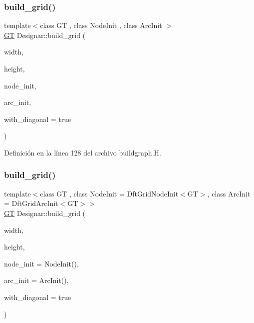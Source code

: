 \mbox{\label{namespace_designar_aec5eb60a497214494947086c4cd7af76}} 
\subsubsection{\texorpdfstring{build\+\_\+grid()}{build\_grid()}\hspace{0.1cm}{\footnotesize\ttfamily [1/2]}}
{\footnotesize\ttfamily template$<$class GT , class Node\+Init , class Arc\+Init $>$ \\
\hyperlink{demo-buildgraph_8_c_a3001c40d2c31ca87ed96cd7d1334a55e}{GT} Designar\+::build\+\_\+grid (\begin{DoxyParamCaption}\item[{\hyperlink{namespace_designar_aa72662848b9f4815e7bf31a7cf3e33d1}{nat\+\_\+t}}]{width,  }\item[{\hyperlink{namespace_designar_aa72662848b9f4815e7bf31a7cf3e33d1}{nat\+\_\+t}}]{height,  }\item[{Node\+Init \&}]{node\+\_\+init,  }\item[{Arc\+Init \&}]{arc\+\_\+init,  }\item[{bool}]{with\+\_\+diagonal = {\ttfamily true} }\end{DoxyParamCaption})}



Definición en la línea 128 del archivo buildgraph.\+H.

\mbox{\label{namespace_designar_a57d0b4318f5ae1ef0082a67d7eeb10fe}} 
\subsubsection{\texorpdfstring{build\+\_\+grid()}{build\_grid()}\hspace{0.1cm}{\footnotesize\ttfamily [2/2]}}
{\footnotesize\ttfamily template$<$class GT , class Node\+Init  = Dft\+Grid\+Node\+Init$<$\+G\+T$>$, class Arc\+Init  = Dft\+Grid\+Arc\+Init$<$\+G\+T$>$$>$ \\
\hyperlink{demo-buildgraph_8_c_a3001c40d2c31ca87ed96cd7d1334a55e}{GT} Designar\+::build\+\_\+grid (\begin{DoxyParamCaption}\item[{\hyperlink{namespace_designar_aa72662848b9f4815e7bf31a7cf3e33d1}{nat\+\_\+t}}]{width,  }\item[{\hyperlink{namespace_designar_aa72662848b9f4815e7bf31a7cf3e33d1}{nat\+\_\+t}}]{height,  }\item[{Node\+Init \&\&}]{node\+\_\+init = {\ttfamily NodeInit()},  }\item[{Arc\+Init \&\&}]{arc\+\_\+init = {\ttfamily ArcInit()},  }\item[{bool}]{with\+\_\+diagonal = {\ttfamily true} }\end{DoxyParamCaption})}



